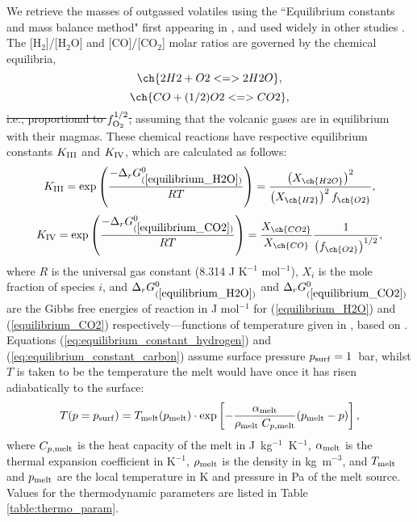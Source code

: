 \documentclass[3p,authoryear]{elsarticle}
\newcommand{\edit}[2]{\sout{#1}\textcolor{blue}{#2}}
\begin{document}
We retrieve the masses of outgassed volatiles using the ``Equilibrium constants and mass balance method" first appearing in \citet{French1966}, and used widely in other studies \citep{Holland1984, Gaillard2014, Fegley2013, schaefer2017redox, Ortenzi2020}. The [H$_2$]/[H$_2$O] and [CO]/[CO$_2$] molar ratios are governed by the chemical equilibria,
\begin{equation}\label{equilibrium_H2O}
    \ch{2 H2 +  O2 <=> 2 H2O},
\end{equation}
\begin{equation}\label{equilibrium_CO2}
    \ch{CO + (1/2) O2 <=> CO2},
    \end{equation}
\edit{i.e., proportional to $f_{\rm O_2}^{1/2}$, }{}assuming that the volcanic gases are in equilibrium with their magmas. These chemical reactions have respective equilibrium constants $K_{\rm III}$ and $K_{\rm IV}$, which are calculated as follows:
\begin{equation}\label{eq:equilibrium_constant_hydrogen}
   {K_{\rm III}}  = \exp\left(\frac{-\Delta_rG^0_{(\ref{equilibrium_H2O})} }{RT}\right) = \frac{\left(X_{\ch{H2O}}\right)^2}{\left(X_{\ch{H2}}\right)^2f_{\ch{O2}}} , 
\end{equation}
\begin{equation}\label{eq:equilibrium_constant_carbon}
    {K_{\rm IV}}  = \exp\left(\frac{-\Delta_rG^0_{(\ref{equilibrium_CO2})}}{RT}\right) = \frac{X_{\ch{CO2}}}{X_{\ch{CO}}}\frac{1}{\left(f_{\ch{O2}}\right)^{1/2}},
\end{equation}
where $R$ is the universal gas constant (8.314 J K$^{-1}$ mol$^{-1}$), $X_{i}$ is the mole fraction of species $i$, and $\Delta_rG^0_{(\ref{equilibrium_H2O})}$ and $\Delta_rG^0_{(\ref{equilibrium_CO2})}$ are the Gibbs free energies of reaction in J mol$^{-1}$ for (\ref{equilibrium_H2O}) and (\ref{equilibrium_CO2}) respectively---functions of temperature given in \citet{Ortenzi2020}, based on \citet{Fegley2013}. Equations (\ref{eq:equilibrium_constant_hydrogen}) and (\ref{eq:equilibrium_constant_carbon}) assume surface pressure $p_{\rm surf} = 1$~bar, whilst $T$ is taken to be the temperature the melt would have once it has risen adiabatically to the surface:
\begin{equation}
    T (p = p_{\rm surf}) = T_{\rm melt}(p_{\rm melt}) \cdot \exp \left[ -\frac{\alpha_{\rm melt}}{\rho_{\rm melt} \; C_{p,{\rm melt}}} (p_{\rm melt} - p) \right],
\end{equation}
where $C_{p,{\rm melt}}$ is the heat capacity of the melt in J~kg$^{-1}$~K$^{-1}$, $\alpha_{\rm melt}$ is the thermal expansion coefficient in K$^{-1}$, $\rho_{\rm melt}$ is the density in kg~m$^{-3}$, and $T_{\rm melt}$ and $p_{\rm melt}$ are the local temperature in K and pressure in Pa of the melt source. Values for the thermodynamic parameters are listed in Table \ref{table:thermo_param}.
\end{document}
